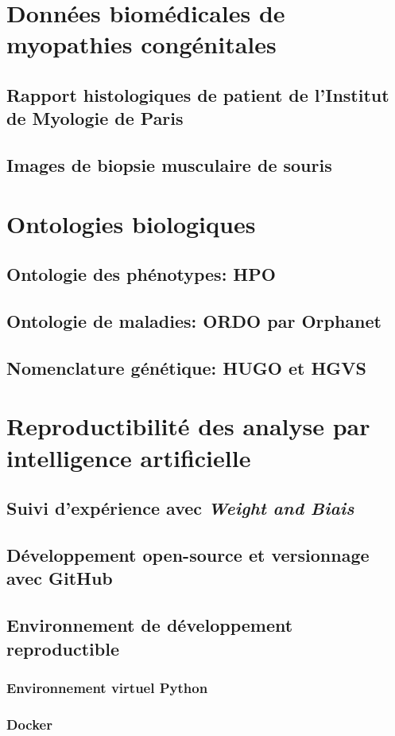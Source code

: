 \section{Données biomédicales de myopathies congénitales}
\subsection{Rapport histologiques de patient de l'Institut de Myologie de Paris}
\subsection{Images de biopsie musculaire de souris}
\section{Ontologies biologiques}
\subsection{Ontologie des phénotypes: HPO}
\subsection{Ontologie de maladies: ORDO par Orphanet}
\subsection{Nomenclature génétique: HUGO et HGVS}
\section{Reproductibilité des analyse par intelligence artificielle}
\subsection{Suivi d'expérience avec \textit{Weight and Biais}}
\subsection{Développement open-source et versionnage avec GitHub}
\subsection{Environnement de développement reproductible}
\subsubsection{Environnement virtuel Python}
\subsubsection{Docker}
